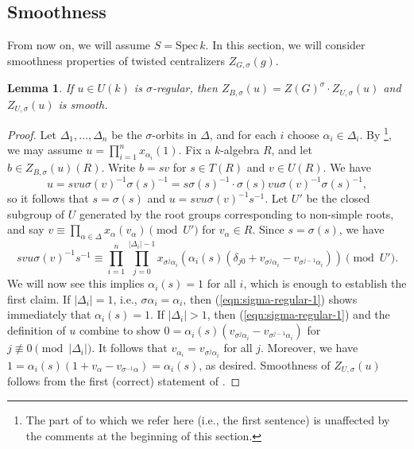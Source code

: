 \documentclass[11pt,reqno]{amsart}
\newtheorem{lemma}[theorem]{Lemma}
\theoremstyle{definition}
\newcommand{\Spec}{\mathrm{Spec} \,}
\begin{document}
\subsection{Smoothness}\label{ss:smooth}

From now on, we will assume $S = \Spec k$. In this section, we will consider smoothness properties of twisted centralizers $Z_{G,\sigma}(g)$.

\begin{lemma}\label{lemma:reg-unip-centralizer}
    If $u \in U(k)$ is $\sigma$-regular, then $Z_{B,\sigma}(u) = Z(G)^\sigma \cdot Z_{U,\sigma}(u)$ and $Z_{U,\sigma}(u)$ is smooth.
\end{lemma}

\begin{proof}
    Let $\Delta_1, \dots, \Delta_n$ be the $\sigma$-orbits in $\Delta$, and for each $i$ choose $\alpha_i \in \Delta_i$. By \cite[Propositions 5.2.4(4), 5.2.19(2)]{Xiao-Zhu}\footnote{The part of \cite[Proposition 5.2.4(4)]{Xiao-Zhu} to which we refer here (i.e., the first sentence) is unaffected by the comments at the beginning of this section.}, we may assume $u = \prod_{i=1}^n x_{\alpha_i}(1)$. Fix a $k$-algebra $R$, and let $b \in Z_{B,\sigma}(u)(R)$. Write $b = sv$ for $s \in T(R)$ and $v \in U(R)$. We have
    \[
    u = svu\sigma(v)^{-1}\sigma(s)^{-1} = s\sigma(s)^{-1} \cdot \sigma(s)vu\sigma(v)^{-1}\sigma(s)^{-1},
    \]
    so it follows that $s = \sigma(s)$ and $u = svu\sigma(v)^{-1}s^{-1}$. Let $U'$ be the closed subgroup of $U$ generated by the root groups corresponding to non-simple roots, and say $v \equiv \prod_{\alpha \in \Delta} x_\alpha(v_\alpha) \pmod{U'}$ for $v_\alpha \in R$. Since $s = \sigma(s)$, we have
    \begin{equation}\label{eqn:sigma-regular-1}
    svu\sigma(v)^{-1}s^{-1} \equiv \prod_{i=1}^n \prod_{j=0}^{|\Delta_i| - 1} x_{\sigma^j\alpha_i}(\alpha_i(s)(\delta_{j0} + v_{\sigma^j\alpha_i} - v_{\sigma^{j-1}\alpha_i})) \pmod{U'}.
    \end{equation}
    We will now see this implies $\alpha_i(s) = 1$ for all $i$, which is enough to establish the first claim. If $|\Delta_i| = 1$, i.e., $\sigma\alpha_i = \alpha_i$, then (\ref{eqn:sigma-regular-1}) shows immediately that $\alpha_i(s) = 1$. If $|\Delta_i| > 1$, then (\ref{eqn:sigma-regular-1}) and the definition of $u$ combine to show $0 = \alpha_i(s)(v_{\sigma^j\alpha_i} - v_{\sigma^{j-1}\alpha_i})$ for $j \not\equiv 0 \pmod{|\Delta_i|}$. It follows that $v_{\alpha_i} = v_{\sigma^j\alpha_i}$ for all $j$. Moreover, we have $1 = \alpha_i(s)(1 + v_\alpha - v_{\sigma^{-1}\alpha}) = \alpha_i(s)$, as desired. Smoothness of $Z_{U,\sigma}(u)$ follows from the first (correct) statement of \cite[Lemma 5.2.5]{Xiao-Zhu}.
\end{proof}
\end{document}

